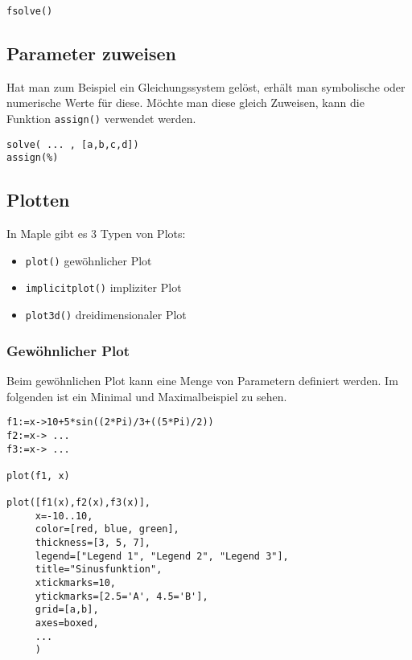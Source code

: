 \begin{lstlisting}[caption=Gleichung numerisch, label=Gleichung numerisch]
fsolve()
\end{lstlisting}

\subsection{Parameter zuweisen}
Hat man zum Beispiel ein Gleichungssystem gelöst, erhält man symbolische oder
numerische Werte für diese. Möchte man diese gleich Zuweisen, kann die Funktion
\verb!assign()! verwendet werden.

\begin{lstlisting}[caption=Parameter zuweisen, label=Parameter zuweisen]
solve( ... , [a,b,c,d])
assign(%)
\end{lstlisting}

\subsection{Plotten}
In Maple gibt es 3 Typen von Plots:
\begin{itemize}
	\item \verb!plot()! \hfill gewöhnlicher Plot
	\item \verb!implicitplot()! \hfill impliziter Plot
	\item \verb!plot3d()! \hfill dreidimensionaler Plot
\end{itemize}

\subsubsection{Gewöhnlicher Plot}
Beim gewöhnlichen Plot kann eine Menge von Parametern definiert werden.
Im folgenden ist ein Minimal und Maximalbeispiel zu sehen.

\begin{lstlisting}[caption=Plot, label=Plot]
f1:=x->10+5*sin((2*Pi)/3+((5*Pi)/2))
f2:=x-> ... 
f3:=x-> ...

plot(f1, x)

plot([f1(x),f2(x),f3(x)], 
     x=-10..10,
     color=[red, blue, green],
     thickness=[3, 5, 7],
     legend=["Legend 1", "Legend 2", "Legend 3"],
     title="Sinusfunktion",
     xtickmarks=10,
     ytickmarks=[2.5='A', 4.5='B'],
     grid=[a,b],
     axes=boxed,
     ...
     )


\end{lstlisting}
